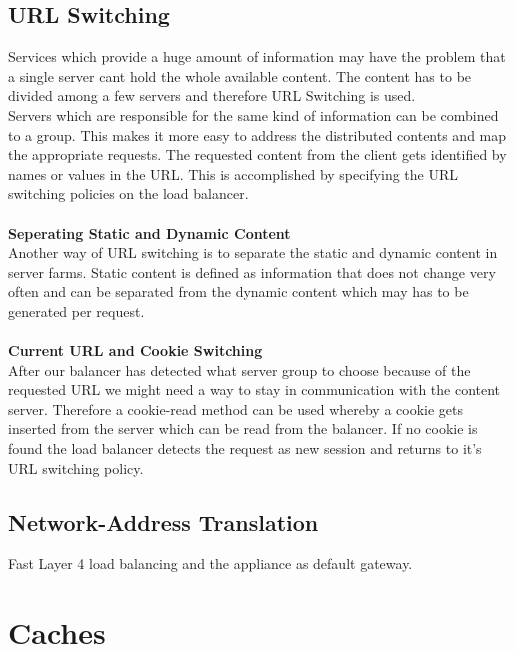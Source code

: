 \documentclass[12p]{article}
\begin{document}
	\subsection{URL Switching}
	Services which provide a huge amount of information may have the problem that a single server cant hold the whole available content. The content has to be divided among a few servers and therefore URL Switching is used.\\
	Servers which are responsible for the same kind of information can be combined to a group. This makes it more easy to address the distributed contents and map the appropriate requests.
	The requested content from the client gets identified by names or values in the URL. This is accomplished by specifying the URL switching policies on the load balancer.\\
	\\
	\textbf{Seperating Static and Dynamic Content}\\
	Another way of URL switching is to separate the static and dynamic content in server farms. Static content is defined as information that does not change very often and can be separated from the dynamic content which may has to be generated per request.\\
	\\
	\textbf{Current URL and Cookie Switching}\\
	After our balancer has detected what server group to choose because of the requested URL we might need a way to stay in communication with the content server. Therefore a cookie-read method can be used whereby a cookie gets inserted from the server which can be read from the balancer.
	If no cookie is found the load balancer detects the request as new session and returns to it's URL switching policy.
	
	\newpage
	\subsection{Network-Address Translation}
	Fast Layer 4 load balancing and the appliance as default gateway.
			
	\newpage
	\section{Caches}
	
\end{document}
